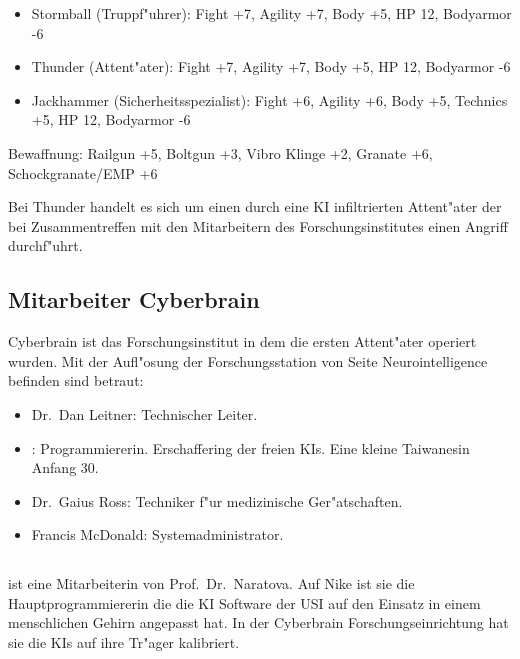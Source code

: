 \begin{itemize}
    \item Stormball (Truppf"uhrer): Fight +7, Agility +7, Body +5, HP 12, Bodyarmor -6
    \item Thunder (Attent"ater): Fight +7, Agility +7, Body +5, HP 12, Bodyarmor -6
    \item Jackhammer (Sicherheitsspezialist): Fight +6, Agility +6, Body +5, Technics +5, HP 12, Bodyarmor -6
\end{itemize}

Bewaffnung: Railgun +5, Boltgun +3, Vibro Klinge +2, Granate +6, Schockgranate/EMP +6 

Bei Thunder handelt es sich um einen durch eine KI infiltrierten Attent"ater der bei Zusammentreffen mit den 
Mitarbeitern des Forschungsinstitutes einen Angriff durchf"uhrt.

\renewcommand{\ml}{\pinyin{Mailin2}}

\subsection{Mitarbeiter Cyberbrain}

Cyberbrain ist das Forschungsinstitut in dem die ersten Attent"ater operiert wurden. Mit der Aufl"osung der Forschungsstation von Seite Neurointelligence befinden sind betraut:

\begin{itemize}
    \item Dr.~Dan Leitner: Technischer Leiter.
    \item \ml{}: Programmiererin. Erschaffering der freien KIs. Eine kleine Taiwanesin Anfang 30. 
    \item Dr.~Gaius Ross: Techniker f"ur medizinische Ger"atschaften.
    \item Francis McDonald: Systemadministrator.
\end{itemize}

\newpage
\subsection[Mailin]{\ml{}}

\ml{} ist eine Mitarbeiterin von Prof.~Dr.~Naratova. Auf Nike ist sie die Hauptprogrammiererin die die KI Software der USI auf den Einsatz in einem menschlichen Gehirn angepasst hat.  In der Cyberbrain Forschungseinrichtung hat sie die KIs auf ihre Tr"ager kalibriert.

